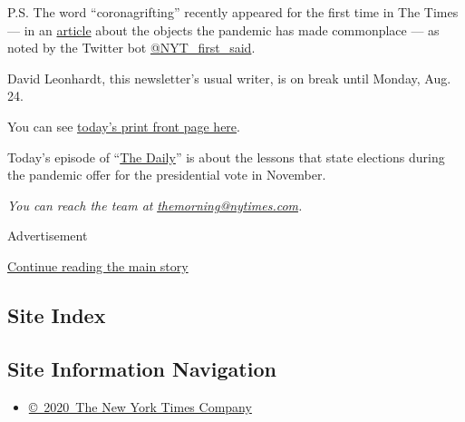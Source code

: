 P.S. The word ``coronagrifting'' recently appeared for the first time in
The Times --- in an
\href{https://www.nytimes.com/2020/08/01/arts/design/virus-design-objects.html}{article}
about the objects the pandemic has made commonplace --- as noted by the
Twitter bot
\href{https://twitter.com/NYT_first_said}{@NYT\_first\_said}.

David Leonhardt, this newsletter's usual writer, is on break until
Monday, Aug. 24.

You can see
\href{https://static01.nyt.com/images/2020/08/04/nytfrontpage/scan.pdf}{today's
print front page here}.

Today's episode of ``\href{https://www.nytimes.com/thedaily}{The
Daily}'' is about the lessons that state elections during the pandemic
offer for the presidential vote in November.

\emph{You can reach the team at}
\href{mailto:themorning@nytimes.com}{\emph{themorning@nytimes.com}}\emph{.}

Advertisement

\protect\hyperlink{after-bottom}{Continue reading the main story}

\hypertarget{site-index}{%
\subsection{Site Index}\label{site-index}}

\hypertarget{site-information-navigation}{%
\subsection{Site Information
Navigation}\label{site-information-navigation}}

\begin{itemize}
\tightlist
\item
  \href{https://help.nytimes.com/hc/en-us/articles/115014792127-Copyright-notice}{©~2020~The
  New York Times Company}
\end{itemize}

